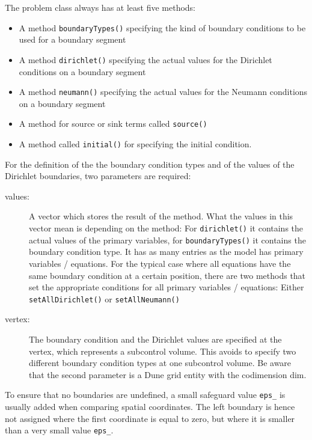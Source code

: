The problem class always has at least five methods:
\begin{itemize}
\item A method \texttt{boundaryTypes()} specifying the kind of
  boundary conditions to be used for a boundary segment
\item A method \texttt{dirichlet()} specifying the actual values for
  the Dirichlet conditions on a boundary segment
\item A method \texttt{neumann()} specifying the actual values for
  the Neumann conditions on a boundary segment
\item A method for source or sink terms called \texttt{source()}
\item A method called \texttt{initial()} for specifying the initial
  condition.
\end{itemize}

For the definition of the the boundary condition types and of the values of the Dirichlet boundaries,
two parameters are required: 
\begin{description}
 \item [values:]  A vector which stores the result of the method. What
  the values in this vector mean is depending on the method: For
  \texttt{dirichlet()} it contains the actual values of the primary
  variables, for \texttt{boundaryTypes()} it contains the boundary 
  condition type. It has as many entries as the model has primary variables / equations.
  For the typical case where all equations have the same boundary
  condition at a certain position, there are two methods that set the appropriate conditions
  for all primary variables / equations: Either \texttt{setAllDirichlet()} or \texttt{setAllNeumann()}
 \item [vertex:] The boundary condition and the Dirichlet values are specified at the vertex, which represents a
  subcontrol volume. This avoids to specify two different boundary condition types at one subcontrol volume. 
  Be aware that the second parameter is a Dune grid entity with the codimension dim. 
\end{description}

To ensure that no boundaries are undefined, a small safeguard value \texttt{eps\_}
is usually added when comparing spatial coordinates. The left boundary is
hence not assigned where the first coordinate is equal to zero, but where it is
smaller than a very small value \texttt{eps\_}.

